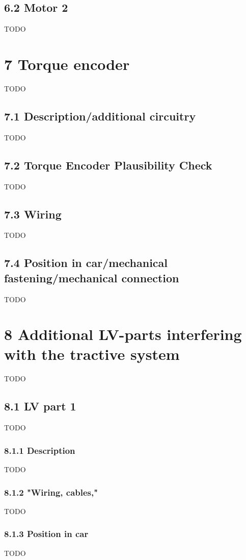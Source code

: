 \documentclass{article}
\begin{document}
\subsection*{6.2 Motor 2}
TODO

\section*{7 Torque encoder}
TODO

\subsection*{7.1 Description/additional circuitry}
TODO

\subsection*{7.2 Torque Encoder Plausibility Check}
TODO

\subsection*{7.3 Wiring}
TODO

\subsection*{7.4 Position in car/mechanical fastening/mechanical connection}
TODO

\section*{8 Additional LV-parts interfering with the tractive system}
TODO

\subsection*{8.1 LV part 1}
TODO

\subsubsection*{8.1.1 Description}
TODO

\subsubsection*{8.1.2 "Wiring, cables,"}
TODO

\subsubsection*{8.1.3 Position in car}
TODO
\end{document}
